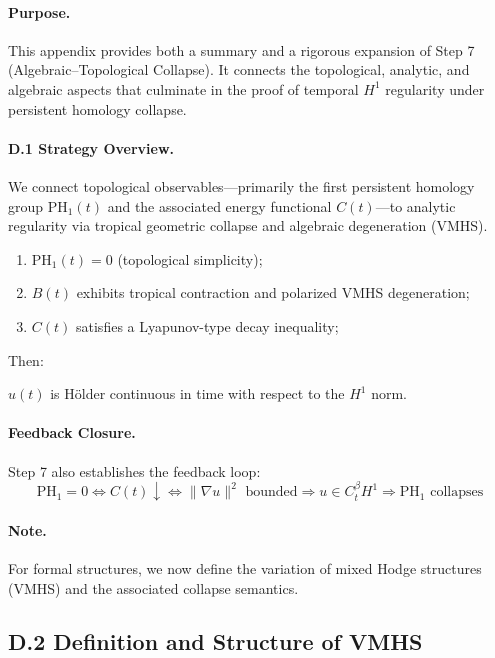 \documentclass[11pt]{article}
\theoremstyle{definition}
\begin{document}
\paragraph{Purpose.}
This appendix provides both a summary and a rigorous expansion of Step 7 (Algebraic–Topological Collapse). It connects the topological, analytic, and algebraic aspects that culminate in the proof of temporal $H^1$ regularity under persistent homology collapse.

\paragraph{D.1 Strategy Overview.}
We connect topological observables—primarily the first persistent homology group $\mathrm{PH}_1(t)$ and the associated energy functional $C(t)$—to analytic regularity via tropical geometric collapse and algebraic degeneration (VMHS).

\begin{enumerate}
  \item $\mathrm{PH}_1(t) = 0$ (topological simplicity);
  \item $B(t)$ exhibits tropical contraction and polarized VMHS degeneration;
  \item $C(t)$ satisfies a Lyapunov-type decay inequality;
\end{enumerate}

Then:
\begin{center}
$u(t)$ is Hölder continuous in time with respect to the $H^1$ norm.
\end{center}

\paragraph{Feedback Closure.}
Step 7 also establishes the feedback loop:
\[
\mathrm{PH}_1 = 0 \Leftrightarrow C(t) \downarrow \Leftrightarrow \|\nabla u\|^2 \text{ bounded} \Rightarrow u \in C^{\beta}_t H^1 \Rightarrow \mathrm{PH}_1 \text{ collapses}
\]

\paragraph{Note.} For formal structures, we now define the variation of mixed Hodge structures (VMHS) and the associated collapse semantics.

\subsection*{D.2 Definition and Structure of VMHS}
\end{document}

